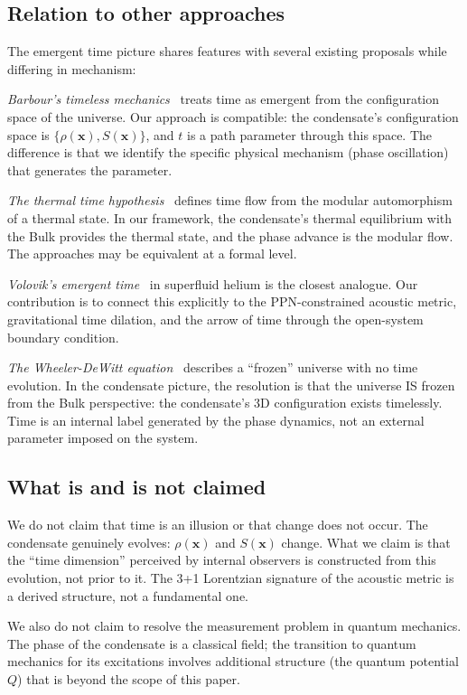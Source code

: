 \documentclass[12pt, a4paper]{article}
\begin{document}
\subsection{Relation to other approaches}

The emergent time picture shares features with
several existing proposals while differing in
mechanism:

\emph{Barbour's timeless mechanics}~\cite{barbour_1999}
treats time as emergent from the configuration space
of the universe. Our approach is compatible: the
condensate's configuration space is
$\{\rho(\mathbf{x}), S(\mathbf{x})\}$, and $t$ is
a path parameter through this space. The difference
is that we identify the specific physical mechanism
(phase oscillation) that generates the parameter.

\emph{The thermal time
hypothesis}~\cite{connes_1994} defines time flow
from the modular automorphism of a thermal state.
In our framework, the condensate's thermal
equilibrium with the Bulk provides the thermal
state, and the phase advance is the modular flow.
The approaches may be equivalent at a formal level.

\emph{Volovik's emergent
time}~\cite{volovik_2003} in superfluid helium is
the closest analogue. Our contribution is to
connect this explicitly to the PPN-constrained
acoustic metric, gravitational time dilation,
and the arrow of time through the open-system
boundary condition.

\emph{The Wheeler-DeWitt
equation}~\cite{dewitt_1967} describes a
``frozen'' universe with no time evolution. In the
condensate picture, the resolution is that the
universe IS frozen from the Bulk perspective:
the condensate's 3D configuration exists
timelessly. Time is an internal label generated
by the phase dynamics, not an external parameter
imposed on the system.

\subsection{What is and is not claimed}

We do not claim that time is an illusion or that
change does not occur. The condensate genuinely
evolves: $\rho(\mathbf{x})$ and $S(\mathbf{x})$
change. What we claim is that the ``time
dimension'' perceived by internal observers is
constructed from this evolution, not prior to it.
The 3+1 Lorentzian signature of the acoustic
metric is a derived structure, not a fundamental
one.

We also do not claim to resolve the measurement
problem in quantum mechanics. The phase of the
condensate is a classical field; the transition
to quantum mechanics for its excitations involves
additional structure (the quantum potential $Q$)
that is beyond the scope of this paper.
\end{document}
